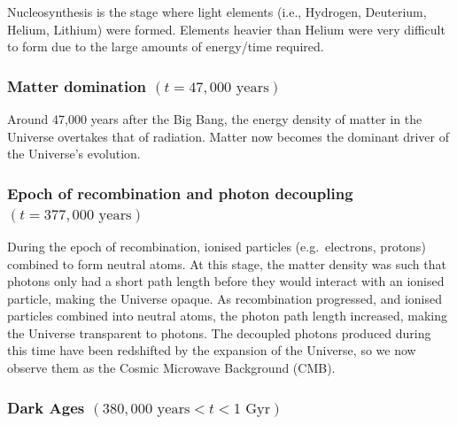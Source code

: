 \documentclass[]{book}
\begin{document}
Nucleosynthesis is the stage where light elements (i.e., Hydrogen,
Deuterium, Helium, Lithium) were formed. Elements heavier than Helium
were very difficult to form due to the large amounts of energy/time
required.

\subsubsection*{\texorpdfstring{Matter domination
\((t = 47,000\text{ years})\)}{Matter domination (t = 47,000\textbackslash{}text\{ years\})}}\label{matter-domination-t-47000text-years}

Around 47,000 years after the Big Bang, the energy density of matter in
the Universe overtakes that of radiation. Matter now becomes the
dominant driver of the Universe's evolution.

\subsubsection*{\texorpdfstring{Epoch of recombination and photon
decoupling
\((t = 377,000\text{ years})\)}{Epoch of recombination and photon decoupling (t = 377,000\textbackslash{}text\{ years\})}}\label{epoch-of-recombination-and-photon-decoupling-t-377000text-years}

During the epoch of recombination, ionised particles (e.g.~electrons,
protons) combined to form neutral atoms. At this stage, the matter
density was such that photons only had a short path length before they
would interact with an ionised particle, making the Universe opaque. As
recombination progressed, and ionised particles combined into neutral
atoms, the photon path length increased, making the Universe transparent
to photons. The decoupled photons produced during this time have been
redshifted by the expansion of the Universe, so we now observe them as
the Cosmic Microwave Background (CMB).

\subsubsection*{\texorpdfstring{Dark Ages
\((380,000 \text{ years}< t < 1\text{ Gyr})\)}{Dark Ages (380,000 \textbackslash{}text\{ years\}\textless{} t \textless{} 1\textbackslash{}text\{ Gyr\})}}\label{dark-ages-380000-text-years-t-1text-gyr}
\end{document}

